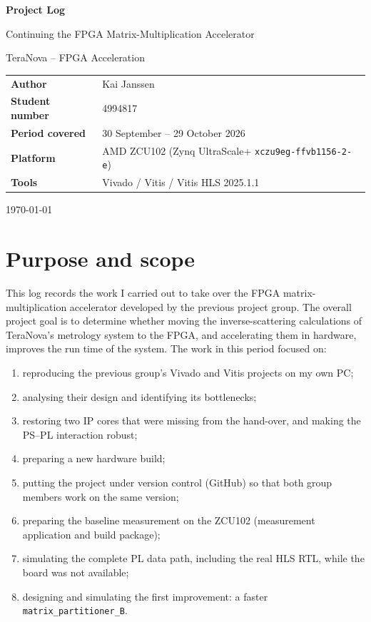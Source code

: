 \documentclass[11pt,a4paper]{article}
\newcommand{\code}[1]{\texttt{#1}}
\begin{document}
\begin{titlepage}
\centering
\vspace*{3cm}
{\LARGE\bfseries Project Log\par}
\vspace{0.5cm}
{\Large Continuing the FPGA Matrix-Multiplication Accelerator\par}
\vspace{0.3cm}
{\large TeraNova -- FPGA Acceleration\par}
\vspace{2cm}
\begin{tabular}{@{}ll@{}}
\textbf{Author}          & Kai Janssen \\
\textbf{Student number}  & 4994817 \\
\textbf{Period covered}  & 30 September -- 29 October 2026 \\
\textbf{Platform}        & AMD ZCU102 (Zynq UltraScale+ \code{xczu9eg-ffvb1156-2-e}) \\
\textbf{Tools}           & Vivado / Vitis / Vitis HLS 2025.1.1 \\
\end{tabular}
\vfill
{\large \today\par}
\end{titlepage}

\tableofcontents
\newpage

\section{Purpose and scope}
This log records the work I carried out to take over the FPGA matrix-multiplication accelerator developed by the previous project group. The overall project goal is to determine whether moving the inverse-scattering calculations of TeraNova's metrology system to the FPGA, and accelerating them in hardware, improves the run time of the system. The work in this period focused on:
\begin{enumerate}[noitemsep]
  \item reproducing the previous group's Vivado and Vitis projects on my own PC;
  \item analysing their design and identifying its bottlenecks;
  \item restoring two IP cores that were missing from the hand-over, and making the PS--PL interaction robust;
  \item preparing a new hardware build;
  \item putting the project under version control (GitHub) so that both group members work on the same version;
  \item preparing the baseline measurement on the ZCU102 (measurement application and build package);
  \item simulating the complete PL data path, including the real HLS RTL, while the board was not available;
  \item designing and simulating the first improvement: a faster \code{matrix\_partitioner\_B}.
\end{enumerate}
\end{document}
